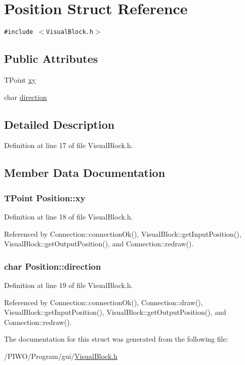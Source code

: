 \hypertarget{structPosition}{
\section{Position Struct Reference}
\label{structPosition}
}
{\tt \#include $<$VisualBlock.h$>$}

\subsection*{Public Attributes}
\begin{CompactItemize}
\item 
TPoint \hyperlink{structPosition_c4da06321f9dd8315c13e4466dfa49dd}{xy}
\item 
char \hyperlink{structPosition_3cbb79c76590aeded35d558f776c0ff7}{direction}
\end{CompactItemize}


\subsection{Detailed Description}


Definition at line 17 of file VisualBlock.h.

\subsection{Member Data Documentation}
\hypertarget{structPosition_c4da06321f9dd8315c13e4466dfa49dd}{
\subsubsection[xy]{\setlength{\rightskip}{0pt plus 5cm}TPoint {\bf Position::xy}}}
\label{structPosition_c4da06321f9dd8315c13e4466dfa49dd}




Definition at line 18 of file VisualBlock.h.

Referenced by Connection::connectionOk(), VisualBlock::getInputPosition(), VisualBlock::getOutputPosition(), and Connection::redraw().\hypertarget{structPosition_3cbb79c76590aeded35d558f776c0ff7}{
\subsubsection[direction]{\setlength{\rightskip}{0pt plus 5cm}char {\bf Position::direction}}}
\label{structPosition_3cbb79c76590aeded35d558f776c0ff7}




Definition at line 19 of file VisualBlock.h.

Referenced by Connection::connectionOk(), Connection::draw(), VisualBlock::getInputPosition(), VisualBlock::getOutputPosition(), and Connection::redraw().

The documentation for this struct was generated from the following file:\begin{CompactItemize}
\item 
/PIWO/Program/gui/\hyperlink{VisualBlock_8h}{VisualBlock.h}\end{CompactItemize}
